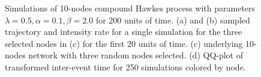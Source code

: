 \documentclass{juliacon}
\begin{document}
\begin{figure}
\hfil
{}
\hfil
{}
\caption{Simulations of 10-nodes compound Hawkes process with parameters \( \lambda = 0.5 , \alpha = 0.1 , \beta = 2.0 \) for \( 200 \) units of time. (a) and (b) sampled trajectory and intensity rate for a single simulation for the three selected nodes in (c) for the first \( 20 \) units of time. (c) underlying 10-nodes network with three random nodes selected. (d) QQ-plot of transformed inter-event time for 250 simulations colored by node.}
\label{fig:hawkes}
\end{figure}
\end{document}

